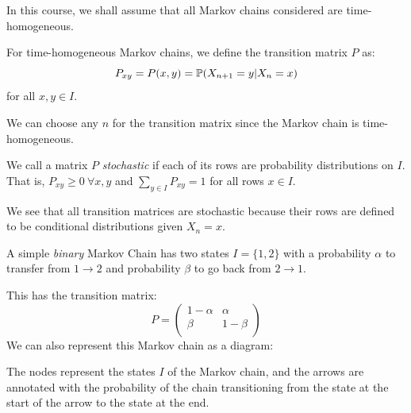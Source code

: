 \documentclass[../main.tex]{subfiles}
\begin{document}
In this course, we shall assume that all Markov chains considered are time-homogeneous.
\begin{definition}
  For time-homogeneous Markov chains, we define the transition matrix $P$ as:
  \[
    P_{x y} = P(x, y) = \P(X_{n + 1} = y \vert X_n = x)
  \]
  for all $x, y \in I$.
\end{definition}
\begin{remark}
  We can choose any $n$ for the transition matrix since the Markov chain is time-homogeneous.
\end{remark}
\begin{definition}
We call a matrix $P$ \textit{stochastic} if each of its rows are probability distributions on $I$.
That is, $P_{x y} \geq 0\ \forall x, y$ and $\sum_{y \in I} P_{x y} = 1$ for all rows $x \in I$. \label{stochasticDef}
\end{definition}
We see that all transition matrices are stochastic because their rows are defined to be conditional distributions given $X_n = x$.
\begin{example}
  A simple \textit{binary} Markov Chain has two states $I = \{1, 2\}$ with a probability $\alpha$ to transfer from $1 \to 2$ and probability $\beta$ to go back from $2 \to 1$. \label{binaryEx}

  This has the transition matrix:
  \[
    P = \begin{pmatrix}
    1 - \alpha & \alpha \\
    \beta & 1 - \beta \\
    \end{pmatrix}
  \]
  We can also represent this Markov chain as a diagram:
  \begin{center}
  \end{center}
  The nodes represent the states $I$ of the Markov chain, and the arrows are annotated with the probability of the chain transitioning from the state at the start of the arrow to the state at the end.
\end{example}
\end{document}
